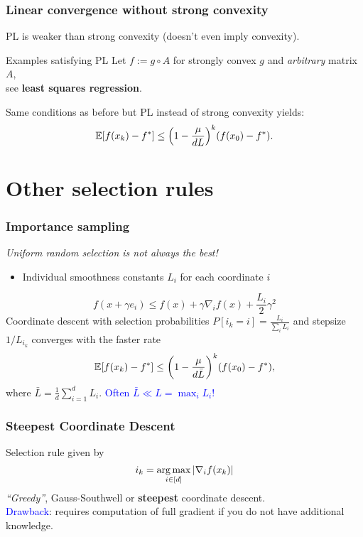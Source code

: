 \documentclass[aspectratio=149]{beamer}
\begin{document}
\begin{frame}
  \frametitle{Linear convergence without strong convexity}
  PL is weaker than strong convexity (doesn't even imply convexity).
  \begin{block}{Examples satisfying PL}
    Let $f := g\circ A$ for strongly convex $g$ and \emph{arbitrary} matrix $A$, \\
    see \textbf{least squares regression}.
  \end{block}

  \begin{corollary}%
    Same conditions as before but PL instead of strong convexity yields:
    \begin{equation}
      \mathbb{E} [f(x_k)- f^*] \le {\left(1 - \frac{\mu}{d L}\right)}^k (f(x_0)-f^*).
    \end{equation}
  \end{corollary}
\end{frame}


\section{Other selection rules}%
\label{sec:}

\begin{frame}
  \frametitle{Importance sampling}
  \begin{center}
    \textit{Uniform random selection is not always the best!}
  \end{center}
  \begin{itemize}
    \item Individual smoothness constants $L_i$ for each coordinate $i$
  \end{itemize}
  \begin{equation}
    f(x+ \gamma e_i) \le f(x) + \gamma \nabla_i f(x) + \frac{L_i}{2} \gamma^2
  \end{equation}
  Coordinate descent with selection probabilities $P[i_k=i] = \frac{L_i}{\sum_i L_i}$ and stepsize
  $1/L_{i_k}$ converges with the faster rate
  \begin{equation}
      \mathbb{E} [f(x_k)- f^*] \le {\left(1 - \frac{\mu}{d \bar{L}}\right)}^k (f(x_0)-f^*),
  \end{equation}
  where $\bar{L}= \frac{1}{d} \sum_{i=1}^{d}L_i$. \hfill \textcolor{blue}{Often $\bar{L} \ll L = \max_i L_i$!}
\end{frame}


\begin{frame}
  \frametitle{Steepest Coordinate Descent}
  Selection rule given by
  \begin{equation}
    i_k = \operatorname*{arg\,max}_{i\in [d]} \vert \nabla_i f(x_k) \vert
  \end{equation}
  \emph{``Greedy''}, Gauss-Southwell or \textbf{steepest} coordinate descent.\\
  \textcolor{blue}{Drawback}: requires computation of full gradient if you do not have additional knowledge.
\end{frame}
\end{document}
